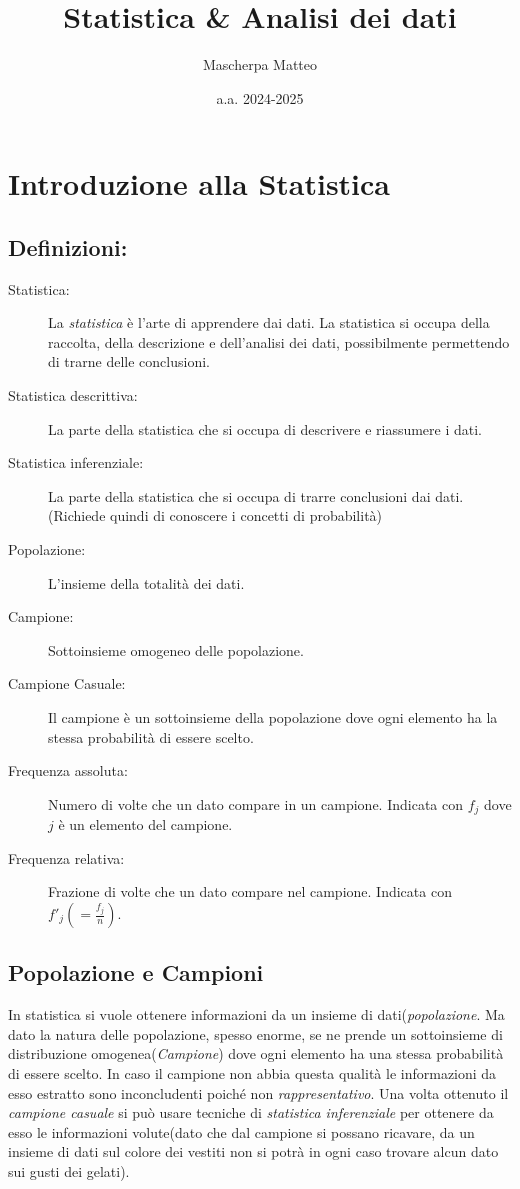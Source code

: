 \documentclass{article}
\title{Statistica \& Analisi dei dati}
\author{Mascherpa Matteo}
\date{a.a. 2024-2025}
\begin{document}
\maketitle


\section{Introduzione alla Statistica}
  \subsection{Definizioni:}
    \begin{description}
      \item[Statistica:] La \textit{statistica} è l'arte di apprendere dai dati. La statistica si occupa della raccolta, della descrizione e dell'analisi dei dati, possibilmente permettendo di trarne delle conclusioni.
      \item[Statistica descrittiva:] La parte della statistica che si occupa di descrivere e riassumere i dati.
      \item[Statistica inferenziale:] La parte della statistica che si occupa di trarre conclusioni dai dati. (Richiede quindi di conoscere i concetti di probabilità)
      \item[Popolazione:] L'insieme della totalità dei dati.
      \item[Campione:] Sottoinsieme omogeneo delle popolazione. 
      \item[Campione Casuale:] Il campione è un sottoinsieme della popolazione dove ogni elemento ha la stessa probabilità di essere scelto.
      \item[Frequenza assoluta:] Numero di volte che un dato compare in un campione. Indicata con $f_j$ dove $j$ è un elemento del campione.
      \item[Frequenza relativa:] Frazione di volte che un dato compare nel campione. Indicata con $f'_j (= \frac{f_j}{n})$.
    \end{description}

  \subsection{Popolazione e Campioni}
    In statistica si vuole ottenere informazioni da un insieme di dati(\textit{popolazione}. Ma dato la natura delle popolazione, spesso enorme, se ne prende un sottoinsieme di distribuzione omogenea(\textit{Campione}) dove ogni elemento ha una stessa probabilità di essere scelto. In caso il campione non abbia questa qualità le informazioni da esso estratto sono inconcludenti poiché non \textit{rappresentativo}. Una volta ottenuto il \textit{campione casuale} si può usare tecniche di \textit{statistica inferenziale} per ottenere da esso le informazioni volute(dato che dal campione si possano ricavare, da un insieme di dati sul colore dei vestiti non si potrà in ogni caso trovare alcun dato sui gusti dei gelati). 
  
\end{document}
